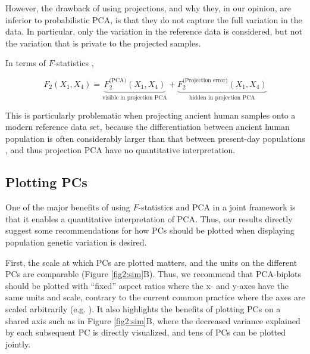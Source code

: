 \documentclass[12pt, letterpaper]{article}
\begin{document}
However, the drawback of using projections, and why they, in our opinion, are inferior to probabilistic PCA, is that they do not capture the full variation in the data. In particular, only the variation in the reference data is considered, but not the variation that is private to the projected samples. 

In terms of $F$-statistics \cite{peter_geometric_2022}, 

\begin{equation*}
    F_2(X_1, X_4) = \underbrace{F_2^{\text{(PCA)}}(X_1, X_4)}_{\text{visible in projection PCA}} + \underbrace{F_2^{\text{(Projection error)}}(X_1, X_4)}_{\text{hidden in projection PCA}}
\end{equation*}

This is particularly problematic when projecting ancient human samples onto a modern reference data set, because the differentiation between ancient human population is often considerably larger than that between present-day populations \citep{haak_massive_2015, lazaridis_ancient_2014}, and thus projection PCA have no quantitative interpretation.


\subsection{Plotting PCs}
One of the major benefits of using $F$-statistics and PCA in a joint framework is that it enables a quantitative interpretation of PCA. Thus, our results directly suggest some recommendations for how PCs should be plotted when displaying population genetic variation is desired. 

First, the scale at which PCs are plotted matters, and the units on the different PCs are comparable (Figure \ref{fig2:sim}B). Thus, we recommend that PCA-biplots should be plotted with ``fixed'' aspect ratios where the x- and y-axes have the same units and scale, contrary to the current common practice where the axes are scaled arbitrarily (e.g. \cite{novembre_genes_2008, peter_genetic_2020}). It also highlights the benefits of plotting PCs on a shared axis such as in Figure \ref{fig2:sim}B, where the decreased variance explained by each subsequent PC is directly visualized, and tens of PCs can be plotted jointly.
\end{document}
